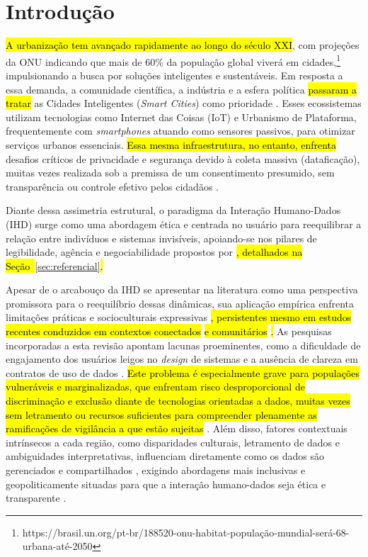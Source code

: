 \documentclass[12pt]{article}
\newcommand{\hlcite}[1]{\colorbox{yellow}{\cite{#1}}} %
\begin{document}


\section{Introdução}

    \hl{A urbanização tem avançado rapidamente ao longo do século XXI}, com projeções da ONU indicando que mais de 60\% da população global viverá em cidades,\footnote{https://brasil.un.org/pt-br/188520-onu-habitat-população-mundial-será-68-urbana-até-2050} impulsionando a busca por soluções inteligentes e sustentáveis. Em resposta a essa demanda, a comunidade científica, a indústria e a esfera política \hl{passaram a tratar} as Cidades Inteligentes (\textit{Smart Cities}) como prioridade \cite{EREMIA2017}. Esses ecossistemas utilizam tecnologias como Internet das Coisas (IoT) e Urbanismo de Plataforma, frequentemente com \textit{smartphones} atuando como sensores passivos, para otimizar serviços urbanos essenciais. \hl{Essa mesma infraestrutura, no entanto, enfrenta} desafios críticos de privacidade e segurança devido à coleta massiva (dataficação), muitas vezes realizada sob a premissa de um consentimento presumido, sem transparência ou controle efetivo pelos cidadãos \cite{streitz2019beyond}.

   Diante dessa assimetria estrutural, o paradigma da Interação Humano-Dados (IHD) surge como uma abordagem ética e centrada no usuário para reequilibrar a relação entre indivíduos e sistemas invisíveis, apoiando-se nos pilares de legibilidade, agência e negociabilidade propostos por \hlcite{mortier2015humandatainteractionhumanface}\hl{, detalhados na Seção~}\ref{sec:referencial}\hl{.}

    Apesar de o arcabouço da IHD se apresentar na literatura como uma perspectiva promissora para o reequilíbrio dessas dinâmicas, sua aplicação empírica enfrenta limitações práticas e socioculturais expressivas \cite{Victorelli2020Human}\hl{, persistentes mesmo em estudos recentes conduzidos em contextos conectados} \hlcite{DOWTHWAITE2024} \hl{e comunitários} \hlcite{hayes2024making}\hl{.} As pesquisas incorporadas a esta revisão apontam lacunas proeminentes, como a dificuldade de engajamento dos usuários leigos no \textit{design} de sistemas e a ausência de clareza em contratos de uso de dados \cite{Victorelli2020Human}. \hl{Este problema é especialmente grave para populações vulneráveis e marginalizadas, que enfrentam risco desproporcional de discriminação e exclusão diante de tecnologias orientadas a dados, muitas vezes sem letramento ou recursos suficientes para compreender plenamente as ramificações de vigilância a que estão sujeitas} \cite{malgieri2020vulnerable, hayes2024making}. Além disso, fatores contextuais intrínsecos a cada região, como disparidades culturais, letramento de dados e ambiguidades interpretativas, influenciam diretamente como os dados são gerenciados e compartilhados \cite{Yuan20243615, Belizario2023Interacao}, exigindo abordagens mais inclusivas e geopoliticamente situadas para que a interação humano-dados seja ética e transparente \cite{Elhamdadi2022}.
\end{document}
